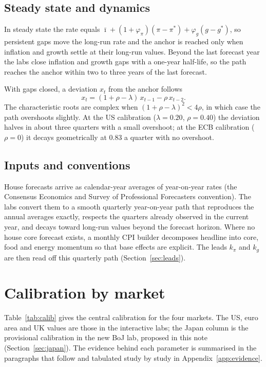 \documentclass[11pt,a4paper]{article}
\newcommand{\ib}{\bar{\imath}}
\newcommand{\pis}{\pi^{*}}
\newcommand{\gs}{g^{*}}
\begin{document}
\subsection{Steady state and dynamics}

In steady state the rate equals $\ib + (1+\varphi_\pi)(\pi-\pis) + \varphi_g(g-\gs)$, so persistent gaps move the long-run rate and the anchor is reached only when inflation and growth settle at their long-run values. Beyond the last forecast year the labs close inflation and growth gaps with a one-year half-life, so the path reaches the anchor within two to three years of the last forecast.

With gaps closed, a deviation $x_t$ from the anchor follows
\begin{equation}
x_t = (1+\rho-\lambda)\,x_{t-1} - \rho\,x_{t-2}.
\label{eq:dyn}
\end{equation}
The characteristic roots are complex when $(1+\rho-\lambda)^2 < 4\rho$, in which case the path overshoots slightly. At the US calibration ($\lambda=0.20$, $\rho=0.40$) the deviation halves in about three quarters with a small overshoot; at the ECB calibration ($\rho=0$) it decays geometrically at $0.83$ a quarter with no overshoot.

\subsection{Inputs and conventions}

House forecasts arrive as calendar-year averages of year-on-year rates (the Consensus Economics and Survey of Professional Forecasters convention). The labs convert them to a smooth quarterly year-on-year path that reproduces the annual averages exactly, respects the quarters already observed in the current year, and decays toward long-run values beyond the forecast horizon. Where no house core forecast exists, a monthly CPI builder decomposes headline into core, food and energy momentum so that base effects are explicit. The leads $k_\pi$ and $k_g$ are then read off this quarterly path (Section~\ref{sec:leads}).

\section{Calibration by market}
\label{sec:calib}

Table~\ref{tab:calib} gives the central calibration for the four markets. The US, euro area and UK values are those in the interactive labs; the Japan column is the provisional calibration in the new BoJ lab, proposed in this note (Section~\ref{sec:japan}). The evidence behind each parameter is summarised in the paragraphs that follow and tabulated study by study in Appendix~\ref{app:evidence}.
\end{document}
